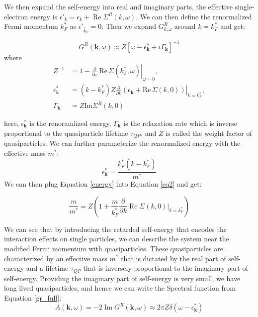 We then expand the self-energy into real and imaginary parts, the effective single-electron energy is $\epsilon'_{k} = \epsilon_k + \operatorname{Re}\Sigma^R(k,\omega)$. We can then define the renormalized Fermi momentum $k^*_{F}$ as $\epsilon'_{\tilde{k_{F}}} = 0$. Then we expand $G^R_{k, \omega}$ around $k = k^*_{F}$ and get: 

\begin{equation}
\label{gr_full}
G^{R}(\mathbf{k}, \omega) \approx Z \left[ \omega - \epsilon^*_{\mathbf{k}} + i \Gamma_{\mathbf{k}} \right]^{-1}
\end{equation}
where
\begin{align} 
	Z^{-1} &= 1 - \left. \frac{\partial}{\partial \omega} \, \mathrm{Re} \, \Sigma (k^*_{F}, \omega) \right|_{\omega = 0}, 
	\\ 
	\label{eq2}
	\epsilon^*_{\mathbf{k}} &= (k - k^*_{F}) Z \left. \frac{\partial}{\partial k} \left( \epsilon_{\mathbf{k}} + \mathrm{Re} \, \Sigma ({k}, 0) \right) \right|_{k = k^*_{F}}, \\ 
	\label{gamma}
	\Gamma_{\mathbf{k}} &= Z \mathrm{Im} \Sigma^{R}({k}, 0) 
\end{align}

\noindent here, $\epsilon^*_{\mathbf{k}}$ is the renoramlized energy, $\Gamma_{\mathbf{k}}$ is the relaxation rate which is inverse proportional to the quasiparticle lifetime $\tau_{QP}$, and $Z$ is called the weight factor of qausiparticles. We can further parameterize the renormalized energy with the effective mass $m^*$: 
\begin{equation}\label{energy}
	\epsilon^*_{\mathbf{k}} = \frac{k^*_F(k-k^*_F)}{m^*}
\end{equation}
We can then plug Equation \ref{energy} into Equation \ref{eq2} and get: 

\begin{equation}
	\frac{m}{m^*} = Z(1 + \frac{m}{k^*_F}\frac{\partial}{\partial k}\operatorname{Re}\Sigma(k,0)|_{k = k^*_{F}})
\end{equation}

We can see that by introducing the retarded self-energy that encodes the interaction effects on single particles, we can describe the system near the modified Fermi momentum with quasiparticles. These quasiparticles are characterized by an effective mass $m^*$ that is dictated by the real part of self-energy and a lifetime $\tau_{QP}$ that is inversely proportional to the imaginary part of self-energy. Providing the imaginary part of self-energy is very small, we have long lived quasiparticles, and hence we can write the Spectral function from Equation \ref{gr_full}:
\begin{equation}
	\label{eq.akw}
	A(\textbf{k},\omega) = -2\operatorname{Im}G^R(\textbf{k}, \omega) 
	\approx 2\pi Z\delta(\omega-\epsilon^*_\textbf{k}) 
\end{equation}

